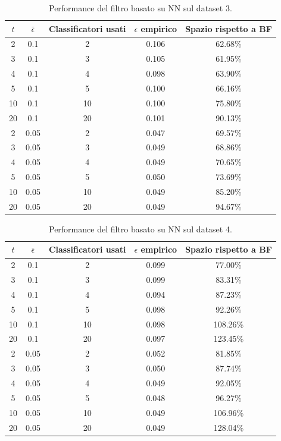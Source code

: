 \begin{table}
    \centering
    \begin{tabular}{|c|c|c|c|c|}
        \hline
        $t$  & $\bar\epsilon$ & Classificatori usati & $\epsilon$ empirico & Spazio rispetto a BF \\ 
        \hline
        2   & 0.1  & 2  & 0.106 & 62.68\% \\ 
        3   & 0.1  & 3  & 0.105 & 61.95\% \\ 
        4   & 0.1  & 4  & 0.098 & 63.90\% \\ 
        5   & 0.1  & 5  & 0.100 & 66.16\% \\  
        10  & 0.1  & 10 & 0.100 & 75.80\% \\  
        20  & 0.1  & 20 & 0.101 & 90.13\% \\  
        2   & 0.05 & 2  & 0.047 & 69.57\% \\ 
        3   & 0.05 & 3  & 0.049 & 68.86\% \\ 
        4   & 0.05 & 4  & 0.049 & 70.65\% \\ 
        5   & 0.05 & 5  & 0.050 & 73.69\% \\  
        10  & 0.05 & 10 & 0.049 & 85.20\% \\  
        20  & 0.05 & 20 & 0.049 & 94.67\% \\  
        \hline
    \end{tabular}
    \caption{Performance del filtro basato su NN sul dataset 3.}
    \label{tab:performance-ds3-mlp}
\end{table}
\begin{table}
    \centering
    \begin{tabular}{|c|c|c|c|c|}
        \hline
        $t$  & $\bar\epsilon$ & Classificatori usati & $\epsilon$ empirico & Spazio rispetto a BF \\ 
        \hline
        2   & 0.1  & 2  & 0.099 & 77.00\% \\ 
        3   & 0.1  & 3  & 0.099 & 83.31\% \\ 
        4   & 0.1  & 4  & 0.094 & 87.23\% \\ 
        5   & 0.1  & 5  & 0.098 & 92.26\% \\  
        10  & 0.1  & 10 & 0.098 & 108.26\% \\  
        20  & 0.1  & 20 & 0.097 & 123.45\% \\  
        2   & 0.05 & 2  & 0.052 & 81.85\% \\ 
        3   & 0.05 & 3  & 0.050 & 87.74\% \\ 
        4   & 0.05 & 4  & 0.049 & 92.05\% \\ 
        5   & 0.05 & 5  & 0.048 & 96.27\% \\  
        10  & 0.05 & 10 & 0.049 & 106.96\% \\  
        20  & 0.05 & 20 & 0.049 & 128.04\% \\  
        \hline
    \end{tabular}
    \caption{Performance del filtro basato su NN sul dataset 4.}
    \label{tab:performance-ds4-mlp}
\end{table}
